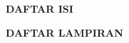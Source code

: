 \clearpage
{}
\begin{center}
  {\fontsize{14}{16.8}\selectfont\bfseries DAFTAR ISI}
\end{center}

{\singlespacing\setlength{\parskip}{0pt}
  \makeatletter
  \makeatother
}

\clearpage
{}
\begin{center}
  {\fontsize{14}{16.8}\selectfont\bfseries DAFTAR LAMPIRAN}
\end{center}

{\singlespacing\setlength{\parskip}{0pt}
  \renewcommand{\cftchappresnum}{Lampiran~}
  \renewcommand{\cftchapaftersnum}{.}
  \settowidth{\cftchapnumwidth}{Lampiran~A.\quad}
  \renewcommand{\cftchapfont}{\normalfont}
  \renewcommand{\cftchappagefont}{\normalfont}
  \renewcommand{\cftchapleader}{\cftdotfill{\cftchapdotsep}}
  \setlength{\cftbeforechapskip}{6pt}
  \makeatletter
  \makeatother
}
